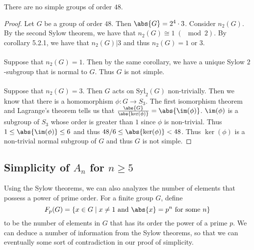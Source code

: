 \documentclass[a4paper]{article}
\begin{document}
\begin{prp}{}{} There are no simple groups of order $48$. \tcbline
\begin{proof}
Let $G$ be a group of order $48$. Then $\abs{G}=2^4\cdot 3$. Consider $n_2(G)$. By the second Sylow theorem, we have that $n_2(G)\cong 1\;(\;\bmod 2)$. By corollary 5.2.1, we have that $n_2(G)|3$ and thus $n_2(G)=1$ or $3$. \\~\\
Suppose that $n_2(G)=1$. Then by the same corollary, we have a unique Sylow $2$-subgroup that is normal to $G$. Thus $G$ is not simple. \\~\\
Suppose that $n_2(G)=3$. Then $G$ acts on $\text{Syl}_2(G)$ non-trivially. Then we know that there is a homomorphism $\phi:G\to S_3$. The first isomorphism theorem and Lagrange's theorem tells us that $\frac{\abs{G}}{\abs{\ker(\phi)}}=\abs{\im(\phi)}$. $\im(\phi)$ is a subgroup of $S_3$ whose order is greater than $1$ since $\phi$ is non-trivial. Thus $1\leq\abs{\im(\phi)}\leq 6$ and thus $48/6\leq\abs{\ker(\phi)}<48$. Thus $\ker(\phi)$ is a non-trivial normal subgroup of $G$ and thus $G$ is not simple. 
\end{proof}
\end{prp}

\subsection{Simplicity of $A_n$ for $n\geq 5$}
Using the Sylow theorems, we can also analyzes the number of elements that possess a power of prime order. For a finite group $G$, define $$F_p(G)=\{x\in G\;|\;x\neq 1\text{ and }\abs{x}=p^n\text{ for some }n\}$$ to be the number of elements in $G$ that has its order the power of a prime $p$. We can deduce a number of information from  the Sylow theorems, so that we can eventually some sort of contradiction in our proof of simplicity. 
\end{document}
